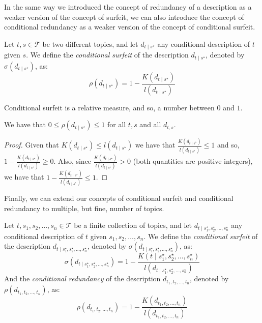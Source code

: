 In the same way we introduced the concept of redundancy of a description as a weaker version of the concept of surfeit, we can also introduce the concept of conditional redundancy as a weaker version of the concept of conditional surfeit.

\begin{definition}
Let $t,s \in \mathcal{T}$ be two different topics, and let $d_{t \mid s^\star}$ any conditional description of $t$ given $s$. We define the \emph{conditional surfeit} of the description $d_{t \mid s^\star}$, denoted by $\sigma(d_{t \mid s^\star})$, as: 
\[
\rho(d_{t \mid s^\star}) = 1 - \frac{K\left( d_{t \mid s^\star} \right)}{l \left( d_{t \mid s^\star} \right)}
\]
\end{definition}

Conditional surfeit is a relative measure, and so, a number between $0$ and $1$.

\begin{proposition}
We have that $0 \leq \rho(d_{t \mid s^\star}) \leq 1$ for all $t,s$ and all $d_{t,s}$.
\end{proposition}
\begin{proof}
Given that $K(d_{t \mid s^\star}) \leq l(d_{t \mid s^\star})$ we have that $\frac{K(d_{t \mid s^\star})}{l \left( d_{t \mid s^\star} \right)} \leq 1$ and so, $1 - \frac{K(d_{t \mid s^\star})}{l \left( d_{t \mid s^\star} \right)} \geq 0$. Also, since $\frac{K(d_{t \mid s^\star})}{l \left( d_{t \mid s^\star} \right)} > 0$ (both quantities are positive integers), we have that $1 - \frac{K(d_{t \mid s^\star})}{l \left( d_{t \mid s^\star} \right)} \leq 1$.
\end{proof}

Finally, we can extend our concepts of conditional surfeit and conditional redundancy to multiple, but fine, number of topics.

\begin{definition}
Let $t, s_1, s_2, \ldots, s_n \in \mathcal{T}$ be a finite collection of topics, and let $d_{t \mid s_1^\star, s_2^\star, \ldots,s_n^\star}$ any conditional description of $t$ given $s_1, s_2, \ldots, s_n$. We define the \emph{conditional surfeit} of the description $d_{t \mid s_1^\star, s_2^\star, \ldots,s_n^\star}$, denoted by $\sigma(d_{t \mid s_1^\star, s_2^\star, \ldots,s_n^\star})$, as: 
\[
\sigma(d_{t \mid s_1^\star, s_2^\star, \ldots,s_n^\star}) = 1 - \frac{K\left( t \mid s_1^\star, s_2^\star, \ldots,s_n^\star \right)}{l \left( d_{t \mid s_1^\star, s_2^\star, \ldots,s_n^\star} \right)}
\]
And the \emph{conditional redundancy} of the description $d_{t_1, t_2, \ldots, t_n}$, denoted by $\rho(d_{t_1, t_2, \ldots, t_n})$, as:
\[
\rho(d_{t_1, t_2, \ldots, t_n}) = 1 - \frac{K(d_{t_1, t_2, \ldots, t_n})}{l \left( d_{t_1, t_2, \ldots, t_n} \right)}
\]
\end{definition}

